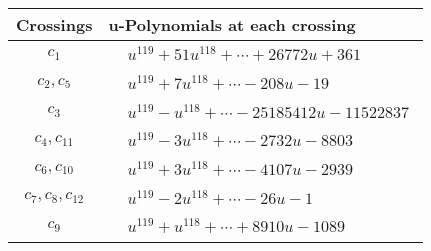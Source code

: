 \documentclass[1p]{elsarticle_modified}
\theoremstyle{definition}
\begin{document}
\begin{tabular}{m{50pt}|m{274pt}}
Crossings & \hspace{64pt}u-Polynomials at each crossing \\
\hline $$\begin{aligned}c_{1}\end{aligned}$$&$\begin{aligned}
&u^{119}+51 u^{118}+\cdots+26772 u+361
\end{aligned}$\\
\hline $$\begin{aligned}c_{2},c_{5}\end{aligned}$$&$\begin{aligned}
&u^{119}+7 u^{118}+\cdots-208 u-19
\end{aligned}$\\
\hline $$\begin{aligned}c_{3}\end{aligned}$$&$\begin{aligned}
&u^{119}- u^{118}+\cdots-25185412 u-11522837
\end{aligned}$\\
\hline $$\begin{aligned}c_{4},c_{11}\end{aligned}$$&$\begin{aligned}
&u^{119}-3 u^{118}+\cdots-2732 u-8803
\end{aligned}$\\
\hline $$\begin{aligned}c_{6},c_{10}\end{aligned}$$&$\begin{aligned}
&u^{119}+3 u^{118}+\cdots-4107 u-2939
\end{aligned}$\\
\hline $$\begin{aligned}c_{7},c_{8},c_{12}\end{aligned}$$&$\begin{aligned}
&u^{119}-2 u^{118}+\cdots-26 u-1
\end{aligned}$\\
\hline $$\begin{aligned}c_{9}\end{aligned}$$&$\begin{aligned}
&u^{119}+u^{118}+\cdots+8910 u-1089
\end{aligned}$\\
\hline
\end{tabular}\\~\\
\end{document}
